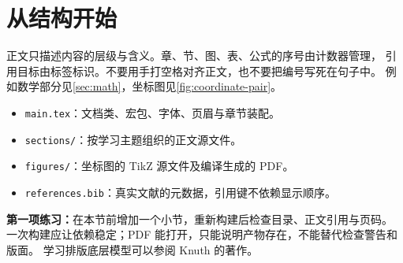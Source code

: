 \section{从结构开始}\label{sec:structure}
正文只描述内容的层级与含义。章、节、图、表、公式的序号由计数器管理，
引用目标由标签标识。不要用手打空格对齐正文，也不要把编号写死在句子中。
例如数学部分见\cref{sec:math}，坐标图见\cref{fig:coordinate-pair}。

\begin{itemize}
  \item \texttt{main.tex}：文档类、宏包、字体、页眉与章节装配。
  \item \texttt{sections/}：按学习主题组织的正文源文件。
  \item \texttt{figures/}：坐标图的 TikZ 源文件及编译生成的 PDF。
  \item \texttt{references.bib}：真实文献的元数据，引用键不依赖显示顺序。
\end{itemize}

\textbf{第一项练习：}在本节前增加一个小节，重新构建后检查目录、正文引用与页码。
一次构建应让依赖稳定；PDF 能打开，只能说明产物存在，不能替代检查警告和版面。
学习排版底层模型可以参阅 Knuth 的著作\cite{knuth1984texbook}。
